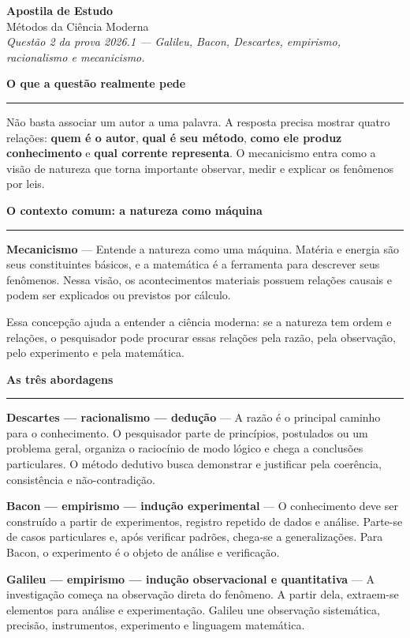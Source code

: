 \documentclass[10pt,a4paper]{article}
\newcommand{\termo}[2]{\vspace{0.2em}\noindent\colorbox{azulclaro}{\parbox{\dimexpr\linewidth-2\fboxsep}{\textbf{#1} --- #2}}\par\vspace{0.2em}}
\newcommand{\secao}[1]{\vspace{0.75em}\noindent\textcolor{azul}{\Large\textbf{#1}}\par\vspace{0.18em}\hrule\vspace{0.32em}}
\begin{document}
\begin{center}
{\LARGE\textbf{Apostila de Estudo}}\\[0.15cm]
{\Large\textcolor{azul}{Métodos da Ciência Moderna}}\\[0.2cm]
\textit{Questão 2 da prova 2026.1 --- Galileu, Bacon, Descartes, empirismo, racionalismo e mecanicismo.}
\end{center}

\secao{O que a questão realmente pede}

Não basta associar um autor a uma palavra. A resposta precisa mostrar quatro relações: \textbf{quem é o autor}, \textbf{qual é seu método}, \textbf{como ele produz conhecimento} e \textbf{qual corrente representa}. O mecanicismo entra como a visão de natureza que torna importante observar, medir e explicar os fenômenos por leis.

\secao{O contexto comum: a natureza como máquina}

\termo{Mecanicismo}{Entende a natureza como uma máquina. Matéria e energia são seus constituintes básicos, e a matemática é a ferramenta para descrever seus fenômenos. Nessa visão, os acontecimentos materiais possuem relações causais e podem ser explicados ou previstos por cálculo.}

Essa concepção ajuda a entender a ciência moderna: se a natureza tem ordem e relações, o pesquisador pode procurar essas relações pela razão, pela observação, pelo experimento e pela matemática.

\secao{As três abordagens}

\termo{Descartes --- racionalismo --- dedução}{A razão é o principal caminho para o conhecimento. O pesquisador parte de princípios, postulados ou um problema geral, organiza o raciocínio de modo lógico e chega a conclusões particulares. O método dedutivo busca demonstrar e justificar pela coerência, consistência e não-contradição.}

\termo{Bacon --- empirismo --- indução experimental}{O conhecimento deve ser construído a partir de experimentos, registro repetido de dados e análise. Parte-se de casos particulares e, após verificar padrões, chega-se a generalizações. Para Bacon, o experimento é o objeto de análise e verificação.}

\termo{Galileu --- empirismo --- indução observacional e quantitativa}{A investigação começa na observação direta do fenômeno. A partir dela, extraem-se elementos para análise e experimentação. Galileu une observação sistemática, precisão, instrumentos, experimento e linguagem matemática.}
\end{document}
